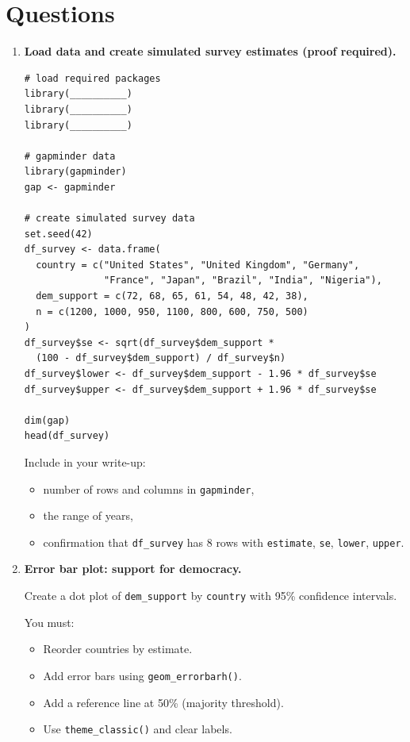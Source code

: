 \documentclass[11pt]{article}
\begin{document}
\section*{Questions}

\begin{enumerate}

\item \textbf{Load data and create simulated survey estimates (proof required).}

\begin{verbatim}
# load required packages
library(__________)
library(__________)
library(__________)

# gapminder data
library(gapminder)
gap <- gapminder

# create simulated survey data
set.seed(42)
df_survey <- data.frame(
  country = c("United States", "United Kingdom", "Germany",
              "France", "Japan", "Brazil", "India", "Nigeria"),
  dem_support = c(72, 68, 65, 61, 54, 48, 42, 38),
  n = c(1200, 1000, 950, 1100, 800, 600, 750, 500)
)
df_survey$se <- sqrt(df_survey$dem_support *
  (100 - df_survey$dem_support) / df_survey$n)
df_survey$lower <- df_survey$dem_support - 1.96 * df_survey$se
df_survey$upper <- df_survey$dem_support + 1.96 * df_survey$se

dim(gap)
head(df_survey)
\end{verbatim}

Include in your write-up:
\begin{itemize}
  \item number of rows and columns in \texttt{gapminder},
  \item the range of years,
  \item confirmation that \texttt{df\_survey} has 8 rows with \texttt{estimate}, \texttt{se}, \texttt{lower}, \texttt{upper}.
\end{itemize}

\item \textbf{Error bar plot: support for democracy.}

Create a dot plot of \texttt{dem\_support} by \texttt{country} with 95\% confidence intervals.

You must:
\begin{itemize}
  \item Reorder countries by estimate.
  \item Add error bars using \texttt{geom\_errorbarh()}.
  \item Add a reference line at 50\% (majority threshold).
  \item Use \texttt{theme\_classic()} and clear labels.
\end{itemize}


\end{enumerate}
\end{document}
